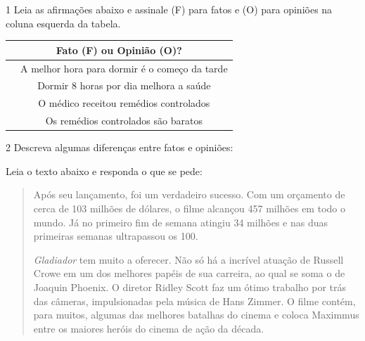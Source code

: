 
\num{1} Leia as afirmações abaixo e assinale (F) para fatos e (O) para
  opiniões na coluna esquerda da tabela. 

\begin{table}[]
\begin{tabular}{|cc|}
\hline
\multicolumn{2}{|c|}{\cellcolor[HTML]{DAE8FC}\textbf{Fato (F) ou Opinião (O)?}} \\ \hline
\multicolumn{1}{|c|}{}      & A melhor hora para dormir é o começo da tarde     \\ \hline
\multicolumn{1}{|c|}{}      & Dormir 8 horas por dia melhora a saúde            \\ \hline
\multicolumn{1}{|c|}{}      & O médico receitou remédios controlados            \\ \hline
\multicolumn{1}{|c|}{}      & Os remédios controlados são baratos               \\ \hline
\end{tabular}
\end{table}


\num{2} Descreva algumas diferenças entre fatos e opiniões:


Leia o texto abaixo e responda o que se pede:

\begin{quote}

Após seu lançamento, foi um verdadeiro sucesso. Com um orçamento de
cerca de 103 milhões de dólares, o filme alcançou 457 milhões em todo o
mundo. Já no primeiro fim de semana atingiu 34 milhões e nas duas
primeiras semanas ultrapassou os 100.

\textit{Gladiador} tem muito a oferecer. Não só há a incrível atuação de Russell
Crowe em um dos melhores papéis de sua carreira, ao qual se soma o de
Joaquin Phoenix. O diretor Ridley Scott faz um ótimo trabalho por trás
das câmeras, impulsionadas pela música de Hans Zimmer. O filme contém,
para muitos, algumas das melhores batalhas do cinema e coloca Maximmus
entre os maiores heróis do cinema de ação da década.

\end{quote}

